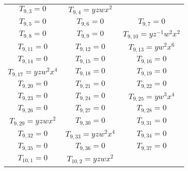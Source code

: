 \documentclass[12pt]{memoireuqam1.3}
\begin{document}
\begin{longtable}{|c|c|c|}
$T_{9,3}= 0$&

$T_{9,4}= yzwx^2$\\

$T_{9,5}= 0$&

$T_{9,6}= 0$&

$T_{9,7}= 0$\\

$T_{9,8}= 0$&

$T_{9,9}= 0$&

$T_{9,10}= yz^{-1}w^2x^2$\\

$T_{9,11}= 0$&

$T_{9,12}= 0$&

$T_{9,13}= yw^2x^6$\\

$T_{9,14}= 0$&

$T_{9,15}= 0$&

$T_{9,16}= 0$\\

$T_{9,17}= yzw^2x^4$&

$T_{9,18}= 0$&

$T_{9,19}= 0$\\

$T_{9,20}= 0$&

$T_{9,21}= 0$&

$T_{9,22}= 0$\\

$T_{9,23}= 0$&

$T_{9,24}= 0$&

$T_{9,25}= yw^3x^4$\\

$T_{9,26}= 0$&

$T_{9,27}= 0$&

$T_{9,28}= 0$\\

$T_{9,29}= yzwx^2$&

$T_{9,30}= 0$&

$T_{9,31}= 0$\\

$T_{9,32}= 0$&

$T_{9,33}= yzw^2x^4$&

$T_{9,34}= 0$\\

$T_{9,35}= 0$&

$T_{9,36}= 0$&

$T_{9,37}= 0$\\

$T_{10,1}= 0$&

$T_{10,2}= yzwx^2$&


\end{longtable}
\end{document}
